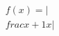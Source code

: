 \documentclass[preview]{standalone}
\begin{document}
\begin{align*}
f(x) =|\\frac{x+1}{x}|
\end{align*}
\end{document}
